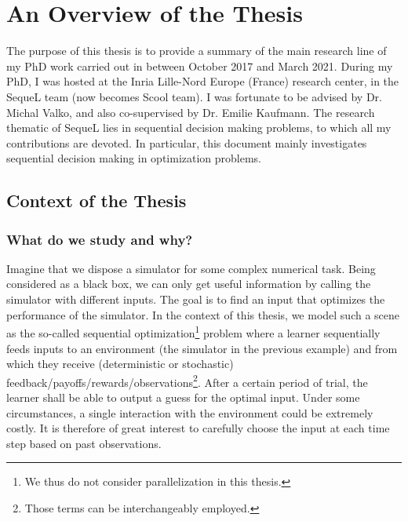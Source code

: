 \chapter{An Overview of the Thesis}\label{CHAP:INTRO}
	\minitoc
	\newpage





The purpose of this thesis is to provide a summary of the main research line of my PhD work carried out in between October 2017 and March 2021. During my PhD, I was hosted at the Inria Lille-Nord Europe (France) research center, in the SequeL team (now becomes Scool team). I was fortunate to be advised by Dr. Michal Valko, and also co-supervised by Dr. Emilie Kaufmann. The research thematic of SequeL lies in sequential decision making problems, to which all my contributions are devoted. In particular, this document mainly investigates sequential decision making in optimization problems.

\section{Context of the Thesis}\label{sec:intro.context}
	
\subsection{What do we study and why?}\label{sec:intro.context.what}

Imagine that we dispose a simulator for some complex numerical task. Being considered as a black box, we can only get useful information by calling the simulator with different inputs. The goal is to find an input that optimizes the performance of the simulator. In the context of this thesis, we model such a scene as the so-called \gls{sequential optimization}\footnote{We thus do not consider parallelization in this thesis.} problem where a learner sequentially feeds inputs to an environment (the simulator in the previous example) and from which they receive (deterministic or stochastic) feedback/payoffs/rewards/observations\footnote{Those terms can be interchangeably employed.}. After a certain period of trial, the learner shall be able to output a guess for the optimal input. Under some circumstances, a single interaction with the environment could be extremely costly. It is therefore of great interest to carefully choose the input at each time step based on past observations.

